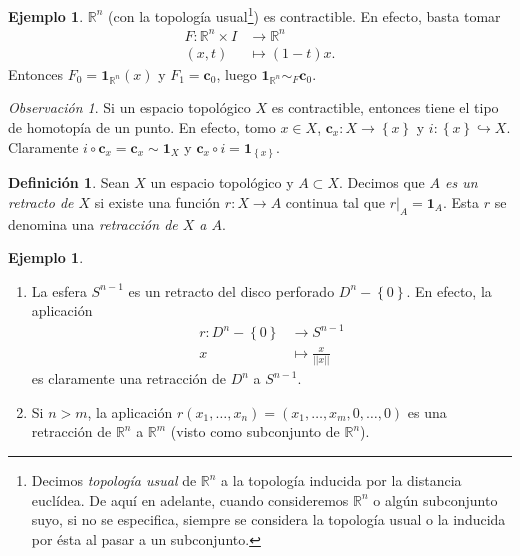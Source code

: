 \documentclass[12pt,a4paper]{book}
\theoremstyle{definition} \newtheorem{defn}[thm]{Definición}
\theoremstyle{definition} \newtheorem{ejemplo}[thm]{Ejemplo}
\theoremstyle{definition} \newtheorem{ejercicio}[thm]{Ejercicio}
\theoremstyle{remark} \newtheorem*{obs}{Observación}
\def\RR{\mathbb{R}}
\def\id{\mathbf{1}}
\def\cc{\mathbf{c}}
\begin{document}
\begin{ejemplo}\label{rcontract}
  $\RR^n$ (con la topología usual\footnote{Decimos \emph{topología usual} de $\RR^n$ a la topología inducida por la distancia euclídea. De aquí en adelante, cuando consideremos $\RR^n$ o algún subconjunto suyo, si no se especifica, siempre se considera la topología usual o la inducida por ésta al pasar a un subconjunto.}) es contractible. En efecto, basta tomar
  \begin{align*}
    F :\RR^n\times I&\longrightarrow \RR^n\\ 
      \left( x,t \right) &\longmapsto (1-t)x. 
    \end{align*}
    Entonces $F_0=\id_{\RR^n}(x)$ y $F_1=\cc_0$, luego $\id_{\RR^n}\sim_F \cc_0$.
\end{ejemplo}

\begin{obs}
  Si un espacio topológico $X$ es contractible, entonces tiene el tipo de homotopía de un punto. En efecto, tomo $x\in X$, $\cc_x:X\rightarrow \left\{ x \right\}$ y $i:\left\{ x \right\}\hookrightarrow X$. Claramente $i\circ \cc_x=\cc_x\sim \id_X$ y $\cc_x \circ i=\id_{\left\{ x \right\}}$.
\end{obs}
\begin{defn}
  Sean $X$ un espacio topológico y $A\subset X$. Decimos que \emph{$A$ es un retracto de $X$} si existe una función $r:X\rightarrow A$ continua tal que $r|_A=\id_A$. Esta $r$ se denomina una \emph{retracción de $X$ a $A$}.
\end{defn}

\begin{ejemplo}\leavevmode
  \begin{enumerate}
    \item La esfera $S^{n-1}$ es un retracto del disco perforado $D^n-\left\{ 0 \right\}$. En efecto, la aplicación
  \begin{align*}
    r :D^n-\left\{ 0 \right\}&\longrightarrow S^{n-1}\\ 
    x &\longmapsto \frac{x}{||x||} 
    \end{align*}
    es claramente una retracción de $D^n$ a $S^{n-1}$.

  \item Si $n>m$, la aplicación
    $ r(x_1,\dots,x_n) = (x_1,\dots,x_m,0,\dots,0) $
      es una retracción de $\RR^n$ a $\RR^m$ (visto como subconjunto de $\RR^n$).
  \end{enumerate}
\end{ejemplo}
\end{document}
